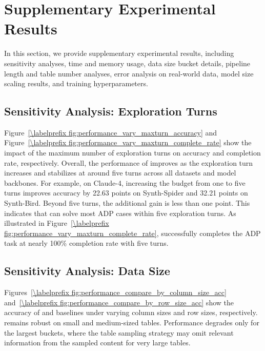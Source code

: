 
\section{Supplementary Experimental Results}
\label{sec:appendix_experiments}

In this section, we provide supplementary experimental results, including sensitivity analyses, time and memory usage, data size bucket details, pipeline length and table number analyses, error analysis on real-world data, model size scaling results, and training hyperparameters.

\subsection{Sensitivity Analysis: Exploration Turns}
\label{subsec:appendix_sensitivity_turns}




Figure~\ref{\labelprefix fig:performance_vary_maxturn_accuracy} and Figure~\ref{\labelprefix fig:performance_vary_maxturn_complete_rate} show the impact of the maximum number of exploration turns on accuracy and completion rate, respectively. Overall, the performance of \sys improves as the exploration turn increases and stabilizes at around five turns across all datasets and model backbones. For example, on Claude-4, increasing the budget from one to five turns improves accuracy by 22.63 points on Synth-Spider and 32.21 points on Synth-Bird. Beyond five turns, the additional gain is less than one point. This indicates that \sys can solve most ADP cases within five exploration turns. As illustrated in Figure~\ref{\labelprefix fig:performance_vary_maxturn_complete_rate}, \sys successfully completes the ADP task at nearly 100\% completion rate with five turns.

\subsection{Sensitivity Analysis: Data Size}
\label{subsec:appendix_sensitivity_data_size}




Figures~\ref{\labelprefix fig:performance_compare_by_column_size_acc} and~\ref{\labelprefix fig:performance_compare_by_row_size_acc} show the accuracy of \sys and baselines under varying column sizes and row sizes, respectively. \sys remains robust on small and medium-sized tables. Performance degrades only for the largest buckets, where the table sampling strategy may omit relevant information from the sampled content for very large tables.

